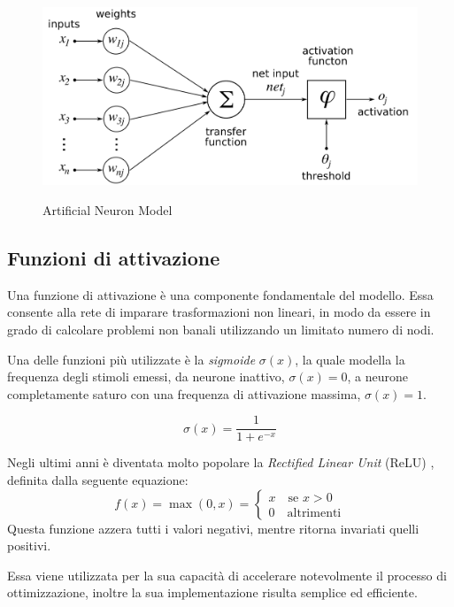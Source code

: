 \begin{figure}[htb]
	\centering
	{\includegraphics[width=.7\textwidth]{images/ArtificialNeuronModel}} 
	\caption{Artificial Neuron Model}
	\label{fig:Modello matematico di un neurone artificiale}
\end{figure}

\subsection{Funzioni di attivazione}
\label{subsec:fattivazione}
Una funzione di attivazione è una componente fondamentale del modello. Essa consente alla rete di imparare trasformazioni non lineari, in modo da essere in grado di calcolare problemi non banali utilizzando un limitato numero di nodi.

Una delle funzioni più utilizzate è la \emph{sigmoide} $\sigma(x)$, la quale modella la frequenza degli stimoli emessi, da neurone inattivo, $\sigma(x)=0$, a neurone completamente saturo con una frequenza di attivazione massima, $\sigma(x)=1$.

\begin{equation}
\sigma(x) = \frac{1}{1+e^{-x}}
\label{eq:sigmoid}
\end{equation}


Negli ultimi anni è diventata molto popolare la \emph{Rectified Linear Unit} (ReLU) \cite{nair2010rectified,hahnloser2000digital,hahnloser2003permitted,glorot2011deep}, definita dalla seguente equazione:
\begin{equation}
f (x) = \max(0, x)= \begin{cases}
x \quad \mbox{se } x>0\\
0 \quad \mbox{altrimenti}
\end{cases}
\label{eq:relu}
\end{equation}
Questa funzione azzera tutti i valori negativi, mentre ritorna invariati quelli positivi.

Essa viene utilizzata per la sua capacità di accelerare notevolmente il processo di ottimizzazione, inoltre la sua implementazione risulta semplice ed efficiente.

